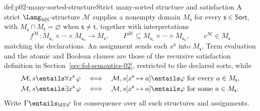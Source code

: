 \begin{hbdefinition}{def:p02-many-sorted-structure}{Strict many-sorted structure and satisfaction}
A strict \(\Lang_{\mathrm{MS}}\)-structure \(\mathcal M\) supplies a nonempty
domain \(M_{\mathsf s}\) for every \(\mathsf s\in\mathsf{Sort}\), with
\(M_{\mathsf s}\cap M_{\mathsf t}=\varnothing\) when
\(\mathsf s\ne\mathsf t\), together with interpretations
\[
 f^{\mathcal M}:M_{\mathsf s_1}\times\cdots\times M_{\mathsf s_n}
   \longrightarrow M_{\mathsf s},
 \qquad
 P^{\mathcal M}\subseteq M_{\mathsf s_1}\times\cdots\times M_{\mathsf s_n},
 \qquad
 c^{\mathcal M}\in M_{\mathsf s}
\]
matching the declarations.  An assignment sends each \(x^{\mathsf s}\) into
\(M_{\mathsf s}\).
Term evaluation and the atomic and Boolean clauses are those of
the recursive satisfaction definition in Section~\ref{sec:fol-semantics-02},
restricted to the declared sorts,
while
\[
\begin{aligned}
 \mathcal M,s\entails\forall x^{\mathsf s}\,\varphi
 &\quad\Longleftrightarrow\quad
 \mathcal M,s[x^{\mathsf s}\mapsto a]\entails\varphi
 \text{ for every }a\in M_{\mathsf s},\\
 \mathcal M,s\entails\exists x^{\mathsf s}\,\varphi
 &\quad\Longleftrightarrow\quad
 \mathcal M,s[x^{\mathsf s}\mapsto a]\entails\varphi
 \text{ for some }a\in M_{\mathsf s}.
\end{aligned}
\]
Write \(\Gamma\entails_{\mathrm{MS}}\varphi\) for consequence over all such
structures and assignments.
\end{hbdefinition}

